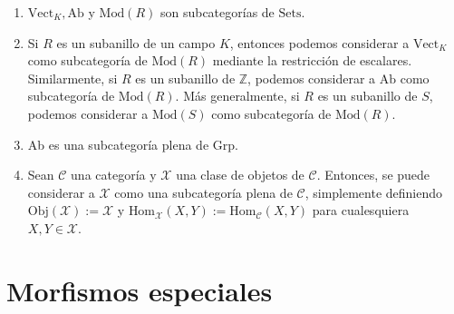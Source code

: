 \documentclass[tesis]{subfiles}
\begin{document}
\begin{Ejem}\label{Ejem: Subcategorías}\leavevmode
    \begin{enumerate}[label=(\arabic*)]
    
        \item $\text{Vect}_K, \text{Ab}$ y $\text{Mod}(R)$ son subcategorías de $\text{Sets}$. 

        \item Si $R$ es un subanillo de un campo $K$, entonces podemos considerar a $\text{Vect}_K$ como subcategoría de $\text{Mod}(R)$ mediante la restricción de escalares. Similarmente, si $R$ es un subanillo de $\mathbb{Z}$, podemos considerar a $\text{Ab}$ como subcategoría de $\text{Mod}(R)$. Más generalmente, si $R$ es un subanillo de $S$, podemos considerar a $\text{Mod}(S)$ como subcategoría de $\text{Mod}(R)$.


        \item Ab es una subcategoría plena de Grp.

        \item Sean $\mathscr{C}$ una categoría y $\mathcal{X}$ una clase de objetos de $\mathscr{C}$. Entonces, se puede considerar a $\mathcal{X}$ como una subcategoría plena de $\mathscr{C}$, simplemente definiendo $\text{Obj}(\mathcal{X}):=\mathcal{X}$ y $\text{Hom}_\mathcal{X}(X,Y):=\text{Hom}_\mathscr{C}(X,Y)$ para cualesquiera $X,Y\in\mathcal{X}$.
    \end{enumerate}
\end{Ejem}

\section{Morfismos especiales} \label{Sec: Morfismos especiales}
\end{document}
